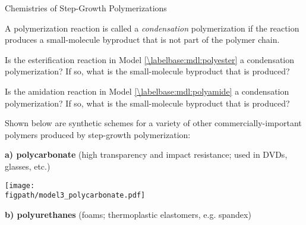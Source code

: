 \begin{activity}{Chemistries of Step-Growth Polymerizations}
\begin{ctqs}
\end{ctqs}
	
\begin{infobox}

A polymerization reaction is called a \emph{condensation} polymerization if the reaction produces a small-molecule byproduct that is not part of the polymer chain.

\end{infobox}
	
\begin{ctqs}
		\question Is the esterification reaction in Model \ref{\labelbase:mdl:polyester} a condensation polymerization?  If so, what is the small-molecule byproduct that is produced?
			
				\begin{solution}[1in]\studentdisplay{~}\end{solution}
		
		\question Is the amidation reaction in Model \ref{\labelbase:mdl:polyamide} a condensation polymerization?  If so, what is the small-molecule byproduct that is produced?
			
				\begin{solution}[1in]\studentdisplay{~}\end{solution}
		
\end{ctqs}

\begin{model}
\label{\labelbase:model:otherstepgrowthchems}

Shown below are synthetic schemes for a variety of other commercially-important polymers produced by step-growth polymerization:

\vspace{0.1in}

\textbf{a) polycarbonate} (high transparency and impact resistance; used in DVDs, glasses, etc.)
		
			\centerline{\texttt{[image: \\figpath/model3\_polycarbonate.pdf]}}

\vspace{0.1in}

\textbf{b) polyurethanes} (foams; thermoplastic elastomers, e.g. spandex)
		

\end{model}
\end{activity}

